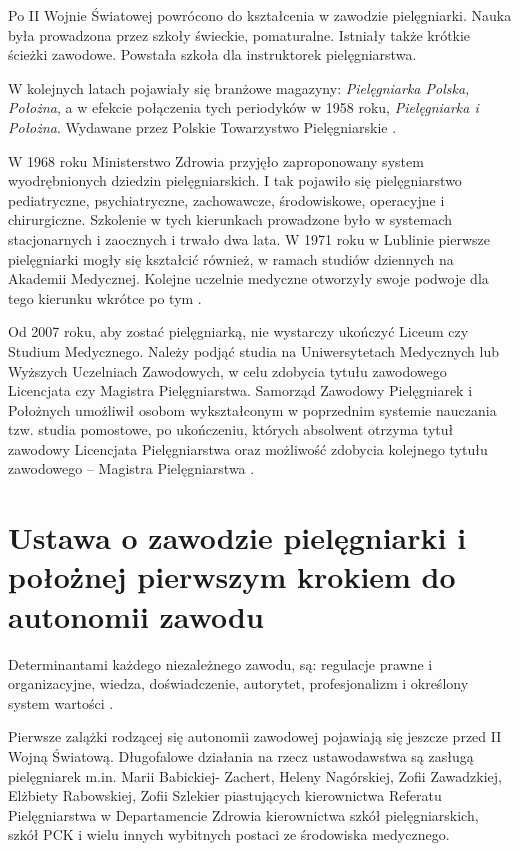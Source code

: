 \documentclass[a4paper,12pt,twoside,openright]{mwrep}
\begin{document}
Po II Wojnie Światowej powrócono do kształcenia w zawodzie pielęgniarki. Nauka była prowadzona przez szkoły świeckie, pomaturalne. Istniały także krótkie ścieżki zawodowe. Powstała szkoła dla instruktorek pielęgniarstwa.

W kolejnych latach pojawiały się branżowe magazyny: \textit{Pielęgniarka Polska, Położna}, a w efekcie połączenia tych periodyków w 1958 roku, \textit{Pielęgniarka i Położna}. Wydawane przez Polskie Towarzystwo Pielęgniarskie \cite{czas}.

W 1968 roku Ministerstwo Zdrowia przyjęło zaproponowany system wyodrębnionych dziedzin pielęgniarskich. I tak pojawiło się pielęgniarstwo pediatryczne, psychiatryczne, zachowawcze, środowiskowe, operacyjne i chirurgiczne. Szkolenie w tych kierunkach prowadzone było w systemach stacjonarnych i zaocznych i trwało dwa lata. W 1971 roku w Lublinie pierwsze pielęgniarki mogły się kształcić również, w ramach studiów dziennych na Akademii Medycznej. Kolejne uczelnie medyczne otworzyły swoje podwoje dla tego kierunku wkrótce po tym \cite{spec}.
 
Od 2007 roku, aby zostać pielęgniarką, nie wystarczy ukończyć Liceum czy Studium Medycznego. Należy podjąć studia na Uniwersytetach Medycznych lub Wyższych Uczelniach Zawodowych, w celu zdobycia tytułu zawodowego Licencjata czy Magistra Pielęgniarstwa. Samorząd Zawodowy Pielęgniarek i Położnych umożliwił osobom wykształconym w poprzednim systemie nauczania tzw. studia pomostowe, po ukończeniu, których absolwent otrzyma tytuł zawodowy Licencjata Pielęgniarstwa oraz możliwość zdobycia kolejnego tytułu zawodowego – Magistra Pielęgniarstwa \cite{model}.

\section{Ustawa o zawodzie pielęgniarki i położnej pierwszym krokiem do autonomii zawodu}
Determinantami każdego niezależnego zawodu, są: regulacje prawne i organizacyjne, wiedza, doświadczenie, autorytet, profesjonalizm i określony system wartości \cite{deter}.

Pierwsze zalążki rodzącej się autonomii zawodowej pojawiają się jeszcze przed II Wojną Światową. Długofalowe działania na rzecz ustawodawstwa są zasługą pielęgniarek m.in.  Marii Babickiej- Zachert, Heleny Nagórskiej, Zofii Zawadzkiej, Elżbiety Rabowskiej, Zofii Szlekier piastujących kierownictwa Referatu Pielęgniarstwa w Departamencie Zdrowia kierownictwa szkół pielęgniarskich, szkół PCK i wielu innych wybitnych postaci ze środowiska medycznego.
\end{document}
